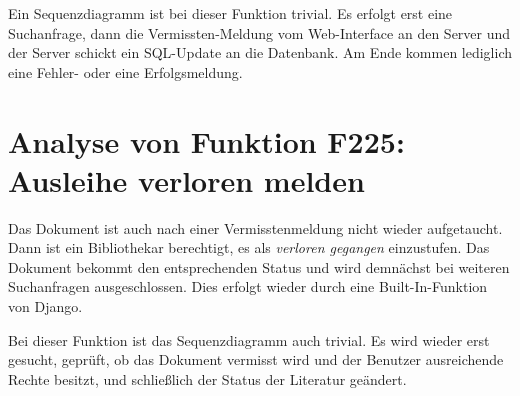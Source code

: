 Ein Sequenzdiagramm ist bei dieser Funktion trivial. Es erfolgt erst eine Suchanfrage, dann die Vermissten-Meldung vom Web-Interface an den Server und der Server schickt ein SQL-Update an die Datenbank. Am Ende kommen lediglich eine Fehler- oder eine Erfolgsmeldung.

\section{Analyse von Funktion F225: Ausleihe verloren melden}
\label{f:225}
Das Dokument ist auch nach einer Vermisstenmeldung nicht wieder aufgetaucht. Dann ist ein Bibliothekar berechtigt, es als \emph{verloren gegangen} einzustufen. Das Dokument bekommt den entsprechenden Status und wird demnächst bei weiteren Suchanfragen ausgeschlossen. Dies erfolgt wieder durch eine Built-In-Funktion von Django.

Bei dieser Funktion ist das Sequenzdiagramm auch trivial. Es wird wieder erst gesucht, geprüft, ob das Dokument vermisst wird und der Benutzer ausreichende Rechte besitzt, und schließlich der Status der Literatur geändert. 